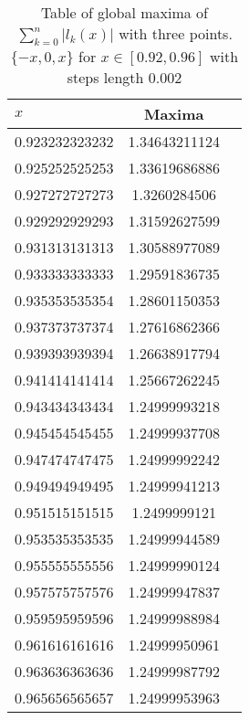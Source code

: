 \begin{solution}
  \begin{table}[!ht]
    \caption{Table of global maxima of $\sum_{k=0}^n|l_k(x)|$ with
      three points. $\{-x, 0, x\}$ for $x \in [0.92, 0.96]$ with
      steps length $0.002$}
    \label{tab:1}
    \begin{center}
      \begin{tabular}{ l  c  r }
        $x$ & Maxima \\ \hline
        0.923232323232 & 1.34643211124 \\
        0.925252525253 & 1.33619686886 \\
        0.927272727273 & 1.3260284506 \\
        0.929292929293 & 1.31592627599 \\
        0.931313131313 & 1.30588977089 \\
        0.933333333333 & 1.29591836735 \\
        0.935353535354 & 1.28601150353 \\
        0.937373737374 & 1.27616862366 \\
        0.939393939394 & 1.26638917794 \\
        0.941414141414 & 1.25667262245 \\
        0.943434343434 & 1.24999993218 \\
        0.945454545455 & 1.24999937708 \\
        0.947474747475 & 1.24999992242 \\
        0.949494949495 & 1.24999941213 \\
        0.951515151515 & 1.2499999121 \\
        0.953535353535 & 1.24999944589 \\
        0.955555555556 & 1.24999990124 \\
        0.957575757576 & 1.24999947837 \\
        0.959595959596 & 1.24999988984 \\
        0.961616161616 & 1.24999950961 \\
        0.963636363636 & 1.24999987792 \\
        0.965656565657 & 1.24999953963 \\
      \end{tabular}
    \end{center}
  \end{table}


\end{solution}
